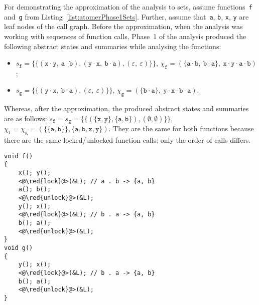 \begin{example}
    For demonstrating the approximation of the analysis to sets, assume functions~\texttt{f} and~\texttt{g} from Listing~\ref{list:atomerPhase1Sets}. Further, assume that~\texttt{a}, \texttt{b}, \texttt{x}, \texttt{y} are leaf nodes of the call graph. Before the approximation, when the analysis was working with sequences of function calls, Phase~1 of the analysis produced the following abstract states and summaries while analysing the functions:
    \begin{itemize}
        \item $ s_\mathtt{f} = \{\{(\mathtt{x} \cdot \mathtt{y},\ \mathtt{a} \cdot \mathtt{b}), (\mathtt{y} \cdot \mathtt{x},\ \mathtt{b} \cdot \mathtt{a}), (\varepsilon,\ \varepsilon)\}\} $, $ \chi_\mathtt{f} = (\{\mathtt{a} \cdot \mathtt{b},\ \mathtt{b} \cdot \mathtt{a}\},\ \mathtt{x} \cdot \mathtt{y} \cdot \mathtt{a} \cdot \mathtt{b}) $;
            
        \item $ s_\mathtt{g} = \{\{(\mathtt{y} \cdot \mathtt{x},\ \mathtt{b} \cdot \mathtt{a}), (\varepsilon,\ \varepsilon)\}\} $, $ \chi_\mathtt{g} = (\{\mathtt{b} \cdot \mathtt{a}\},\ \mathtt{y} \cdot \mathtt{x} \cdot \mathtt{b} \cdot \mathtt{a}) $.
    \end{itemize}
    Whereas, after the approximation, the produced abstract states and summaries are as follows: $ s_\mathtt{f} = s_\mathtt{g} = \{\{(\{\mathtt{x}, \mathtt{y}\}, \{\mathtt{a}, \mathtt{b}\}), (\emptyset, \emptyset)\}\} $, $ \chi_\mathtt{f} = \chi_\mathtt{g} = (\{\{\mathtt{a}, \mathtt{b}\}\}, \{\mathtt{a}, \mathtt{b}, \mathtt{x}, \mathtt{y}\}) $. They are the same for both functions because there are the same locked/unlocked function calls; only the order of calls differs.
\end{example}

\begin{lstlisting}[style=c, label={list:atomerPhase1Sets}, float=hbt, caption={A~code snippet used to illustrate the proposed \emph{approximation} of the first phase of the analysis in the new version of Atomer using \emph{sets of function calls}}]
void f()
{
    x(); y();
    <@\red{lock}@>(&L); // a . b -> {a, b}
    a(); b();
    <@\red{unlock}@>(&L);
    y(); x();
    <@\red{lock}@>(&L); // b . a -> {a, b}
    b(); a();
    <@\red{unlock}@>(&L);
}
void g()
{
    y(); x();
    <@\red{lock}@>(&L); // b . a -> {a, b}
    b(); a();
    <@\red{unlock}@>(&L);
}
\end{lstlisting}

